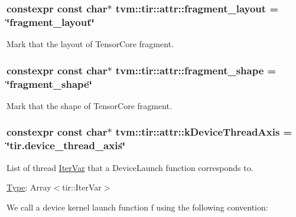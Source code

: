 \subsubsection[{\texorpdfstring{fragment\+\_\+layout}{fragment_layout}}]{\setlength{\rightskip}{0pt plus 5cm}constexpr const char$\ast$ tvm\+::tir\+::attr\+::fragment\+\_\+layout = \char`\"{}fragment\+\_\+layout\char`\"{}}\hypertarget{namespacetvm_1_1tir_1_1attr_a9b33cc65f756817e691b49782ee103bd}{}\label{namespacetvm_1_1tir_1_1attr_a9b33cc65f756817e691b49782ee103bd}


Mark that the layout of Tensor\+Core fragment. 

\subsubsection[{\texorpdfstring{fragment\+\_\+shape}{fragment_shape}}]{\setlength{\rightskip}{0pt plus 5cm}constexpr const char$\ast$ tvm\+::tir\+::attr\+::fragment\+\_\+shape = \char`\"{}fragment\+\_\+shape\char`\"{}}\hypertarget{namespacetvm_1_1tir_1_1attr_a93d76d80fd7252d66991dc650693c0ef}{}\label{namespacetvm_1_1tir_1_1attr_a93d76d80fd7252d66991dc650693c0ef}


Mark that the shape of Tensor\+Core fragment. 

\subsubsection[{\texorpdfstring{k\+Device\+Thread\+Axis}{kDeviceThreadAxis}}]{\setlength{\rightskip}{0pt plus 5cm}constexpr const char$\ast$ tvm\+::tir\+::attr\+::k\+Device\+Thread\+Axis = \char`\"{}tir.\+device\+\_\+thread\+\_\+axis\char`\"{}}\hypertarget{namespacetvm_1_1tir_1_1attr_a4933845b75cf4f08fb66f55fdd94986f}{}\label{namespacetvm_1_1tir_1_1attr_a4933845b75cf4f08fb66f55fdd94986f}


List of thread \hyperlink{classtvm_1_1tir_1_1IterVar}{Iter\+Var} that a Device\+Launch function corresponds to. 

\hyperlink{classtvm_1_1Type}{Type}\+: Array$<$tir\+::\+Iter\+Var$>$

We call a device kernel launch function f using the following convention\+:

